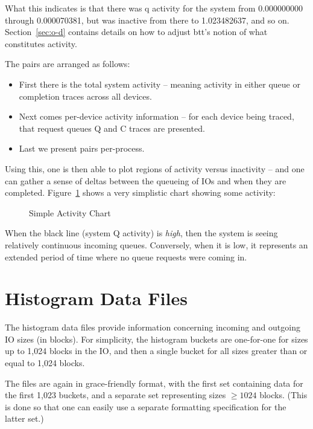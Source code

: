 \documentclass{article}
\begin{document}
  What this indicates is that there was q activity for the system
  from 0.000000000 through 0.000070381, but was inactive from there to
  1.023482637, and so on. Section~\ref{sec:o-d} contains details on how
  to adjust btt's notion of what constitutes activity.

  The pairs are arranged as follows:

  \begin{itemize}
    \item First there is the total system activity -- meaning activity
    in either queue or completion traces across all devices.

    \item Next comes per-device activity information -- for each device
    being traced, that request queues Q and C traces are presented.

    \item Last we present pairs per-process.
  \end{itemize}

  Using this, one is then able to plot regions of activity versus
  inactivity -- and one can gather a sense of deltas between the queueing
  of IOs and when they are completed. Figure~\ref{fig:activity} shows
  a very simplistic chart showing some activity:

  \begin{figure}[hb]
  \leavevmode\centering
  \caption{\label{fig:activity}Simple Activity Chart}
  \end{figure}

  When the black line (system Q activity) is \emph{high}, then the
  system is seeing relatively continuous incoming queues. Conversely,
  when it is low, it represents an extended period of time where no
  queue requests were coming in.

\newpage\section{\label{sec:hist}Histogram Data Files}

  The histogram data files provide information concerning incoming and
  outgoing IO sizes (in blocks). For simplicity, the histogram buckets
  are one-for-one for sizes up to 1,024 blocks in the IO, and then a
  single bucket for all sizes greater than or equal to 1,024 blocks.

  The files are again in grace-friendly format, with the first set
  containing data for the first 1,023 buckets, and a separate set
  representing sizes $\ge 1024$ blocks. (This is done so that one can
  easily use a separate formatting specification for the latter set.)
\end{document}
